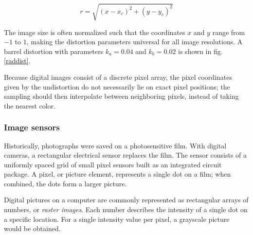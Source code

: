 \begin{equation}
r = \sqrt{(x - x_c)^2 + (y - y_c)^2}
\end{equation}


The image size is often normalized such that the coordinates $x$ and $y$ range from $-1$ to $1$, making the distortion parameters universal for all image resolutions.
A barrel distortion with parameters $k_a = 0.04$ and $k_b = 0.02$ is shown in fig. \ref{raddist}.


Because digital images consist of a discrete pixel array, the pixel coordinates given by the undistortion do not necessarily lie on exact pixel positions;
the sampling should then interpolate between neighboring pixels, instead of taking the nearest color.




\subsubsection{Image sensors} \label{sec:sensors} %


Historically, photographs were saved on a photosensitive film.
With digital cameras, a rectangular electrical sensor replaces the film.
The sensor consists of a uniformly spaced grid of small pixel sensors built as an integrated circuit package.
A pixel, or picture element, represents a single dot on a film; when combined, the dots form a larger picture.


Digital pictures on a computer are commonly represented as rectangular arrays of numbers, or \emph{raster images}.
Each number describes the intensity of a single dot on a specific location.
For a single intensity value per pixel, a grayscale picture would be obtained.


